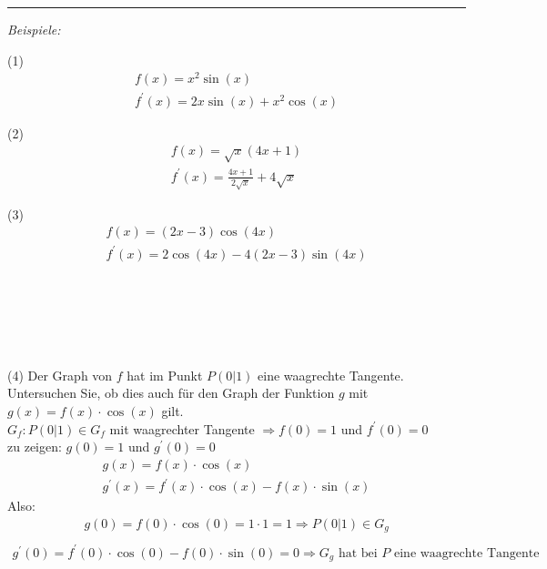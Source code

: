 \noindent\rule{\textwidth}{1pt}

\textit{Beispiele:}

(1) 
\begin{equation*}
    \begin{gathered}
    f(x) = x^2 \sin(x) \\
    f^\prime(x) = 2x \sin(x) + x^2 \cos(x)
    \end{gathered}
\end{equation*}

(2) 
\begin{equation*}
    \begin{gathered}
     f(x)  = \sqrt{x}(4x + 1) \\
     f^\prime(x)  = \frac{4x + 1}{2\sqrt{x}} + 4 \sqrt{x}    
    \end{gathered}
\end{equation*}

(3) 
\begin{equation*}
    \begin{gathered}
     f(x)  = (2x - 3) \cos(4x) \\
     f^\prime(x)  = 2\cos(4x)-4(2x-3)\sin(4x)    
    \end{gathered}
\end{equation*}

\ \\
\ \\
\ \\
\ \\
\ \\

(4) Der Graph von $f$ hat im Punkt $P(0|1)$ eine waagrechte Tangente. Untersuchen Sie, ob dies auch für den Graph der Funktion $g$ mit $g(x) = f(x) \cdot \cos(x)$ gilt.\\

$G_f: P(0|1) \in G_f$ mit waagrechter Tangente $\Rightarrow f(0) = 1$ und $f^\prime(0) = 0$ \\
zu zeigen: $g(0) = 1$ und $g^\prime(0) = 0$
\begin{equation*}
    \begin{gathered}
        g(x) = f(x) \cdot \cos(x) \\
        g^\prime(x) = f^\prime(x) \cdot \cos(x) - f(x) \cdot \sin(x)
    \end{gathered}
\end{equation*} 
Also:
\begin{equation*}
    \begin{gathered}
        g(0) = f(0) \cdot \cos(0) = 1 \cdot 1 = 1 \Rightarrow P(0|1) \in G_g \tag{1} \label{1} \\
    \end{gathered}
\end{equation*}
\begin{equation*}
    \begin{gathered}
        g^\prime(0) = f^\prime(0) \cdot \cos(0) - f(0) \cdot \sin(0) = 0 \Rightarrow \text{$G_g$ hat bei $P$ eine waagrechte Tangente} \tag{2} \label{2}
    \end{gathered}
\end{equation*}

